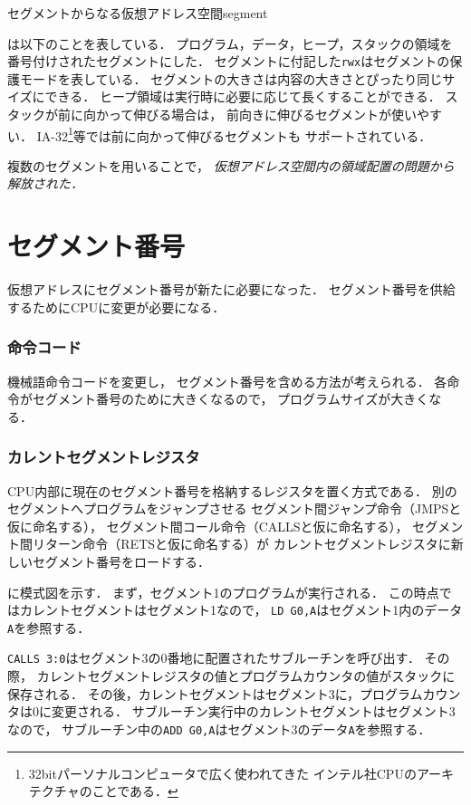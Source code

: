 {セグメントからなる仮想アドレス空間}{segment}

は以下のことを表している．
プログラム，データ，ヒープ，スタックの領域を番号付けされたセグメントにした．
セグメントに付記した\texttt{rwx}はセグメントの保護モードを表している．
セグメントの大きさは内容の大きさとぴったり同じサイズにできる．
ヒープ領域は実行時に必要に応じて長くすることができる．
スタックが前に向かって伸びる場合は，
前向きに伸びるセグメントが使いやすい．
IA-32\footnote{
32bitパーソナルコンピュータで広く使われてきた
インテル社CPUのアーキテクチャのことである．
}等では前に向かって伸びるセグメントも
サポートされている\cite{ia32Segmentation}．

複数のセグメントを用いることで，
\emph{仮想アドレス空間内の領域配置の問題から解放された．}

\section{セグメント番号}
仮想アドレスにセグメント番号が新たに必要になった．
セグメント番号を供給するためにCPUに変更が必要になる．

\subsubsection{命令コード}
機械語命令コードを変更し，
セグメント番号を含める方法が考えられる．
各命令がセグメント番号のために大きくなるので，
プログラムサイズが大きくなる．

\subsubsection{カレントセグメントレジスタ}
CPU内部に現在のセグメント番号を格納するレジスタを置く方式である．
別のセグメントへプログラムをジャンプさせる
セグメント間ジャンプ命令（JMPSと仮に命名する），
セグメント間コール命令（CALLSと仮に命名する），
セグメント間リターン命令（RETSと仮に命名する）が
カレントセグメントレジスタに新しいセグメント番号をロードする．

に模式図を示す．
まず，セグメント1のプログラムが実行される．
この時点ではカレントセグメントはセグメント1なので，
\texttt{LD G0,A}はセグメント1内のデータ\texttt{A}を参照する．

\texttt{CALLS 3:0}はセグメント3の0番地に配置されたサブルーチンを呼び出す．
その際，
カレントセグメントレジスタの値とプログラムカウンタの値がスタックに保存される．
その後，カレントセグメントはセグメント3に，プログラムカウンタは0に変更される．
サブルーチン実行中のカレントセグメントはセグメント3なので，
サブルーチン中の\texttt{ADD G0,A}はセグメント3のデータ\texttt{A}を参照する．

